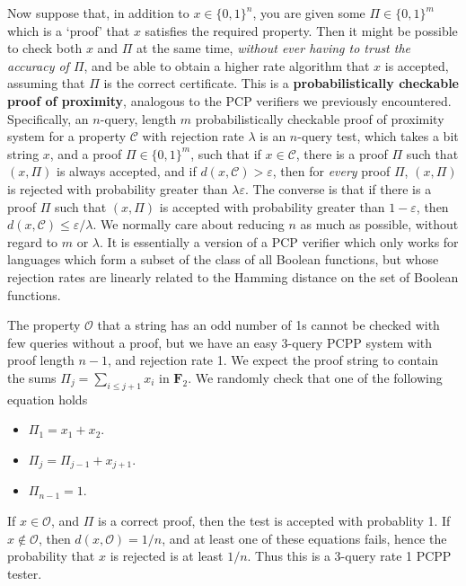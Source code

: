 Now suppose that, in addition to $x \in \{ 0, 1 \}^n$, you are given some $\Pi \in \{ 0, 1 \}^m$ which is a `proof' that $x$ satisfies the required property. Then it might be possible to check both $x$ and $\Pi$ at the same time, {\it without ever having to trust the accuracy of $\Pi$}, and be able to obtain a higher rate algorithm that $x$ is accepted, assuming that $\Pi$ is the correct certificate. This is a {\bf probabilistically checkable proof of proximity}, analogous to the PCP verifiers we previously encountered. Specifically, an $n$-query, length $m$ probabilistically checkable proof of proximity system for a property $\mathcal{C}$ with rejection rate $\lambda$ is an $n$-query test, which takes a bit string $x$, and a proof $\Pi \in \{ 0, 1 \}^m$, such that if $x \in \mathcal{C}$, there is a proof $\Pi$ such that $(x,\Pi)$ is always accepted, and if $d(x,\mathcal{C}) > \varepsilon$, then for {\it every} proof $\Pi$, $(x,\Pi)$ is rejected with probability greater than $\lambda \varepsilon$. The converse is that if there is a proof $\Pi$ such that $(x,\Pi)$ is accepted with probability greater than $1 - \varepsilon$, then $d(x,\mathcal{C}) \leq \varepsilon/\lambda$. We normally care about reducing $n$ as much as possible, without regard to $m$ or $\lambda$. It is essentially a version of a PCP verifier which only works for languages which form a subset of the class of all Boolean functions, but whose rejection rates are linearly related to the Hamming distance on the set of Boolean functions.

\begin{example}
    The property $\mathcal{O}$ that a string has an odd number of 1s cannot be checked with few queries without a proof, but we have an easy 3-query PCPP system with proof length $n-1$, and rejection rate 1. We expect the proof string to contain the sums $\Pi_j = \sum_{i \leq j+1} x_i$ in $\mathbf{F}_2$. We randomly check that one of the following equation holds
    \begin{itemize}
        \item $\Pi_1 = x_1 + x_2$.
        \item $\Pi_j = \Pi_{j-1} + x_{j+1}$.
        \item $\Pi_{n-1} = 1$.
    \end{itemize}
    If $x \in \mathcal{O}$, and $\Pi$ is a correct proof, then the test is accepted with probablity 1. If $x \not \in \mathcal{O}$, then $d(x,\mathcal{O}) = 1/n$, and at least one of these equations fails, hence the probability that $x$ is rejected is at least $1/n$. Thus this is a 3-query rate 1 PCPP tester.
\end{example}

